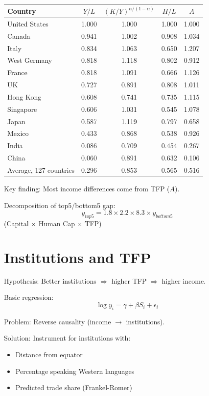 \documentclass[a4paper,11pt]{article}
\begin{document}
\begin{center}
\begin{tabular}{lcccc}
\toprule
Country & $Y/L$ & $(K/Y)^{\alpha/(1-\alpha)}$ & $H/L$ & $A$ \\
\midrule
United States & 1.000 & 1.000 & 1.000 & 1.000 \\
Canada & 0.941 & 1.002 & 0.908 & 1.034 \\
Italy & 0.834 & 1.063 & 0.650 & 1.207 \\
West Germany & 0.818 & 1.118 & 0.802 & 0.912 \\
France & 0.818 & 1.091 & 0.666 & 1.126 \\
UK & 0.727 & 0.891 & 0.808 & 1.011 \\
Hong Kong & 0.608 & 0.741 & 0.735 & 1.115 \\
Singapore & 0.606 & 1.031 & 0.545 & 1.078 \\
Japan & 0.587 & 1.119 & 0.797 & 0.658 \\
Mexico & 0.433 & 0.868 & 0.538 & 0.926 \\
India & 0.086 & 0.709 & 0.454 & 0.267 \\
China & 0.060 & 0.891 & 0.632 & 0.106 \\
\midrule
Average, 127 countries & 0.296 & 0.853 & 0.565 & 0.516 \\
\bottomrule
\end{tabular}
\end{center}

Key finding: Most income differences come from TFP ($A$).

Decomposition of top5/bottom5 gap:
\[
y_{top5} = 1.8 \times 2.2 \times 8.3 \times y_{bottom5}
\tag{Decomposition}
\]
(Capital $\times$ Human Cap $\times$ TFP)

\section{Institutions and TFP}

Hypothesis: Better institutions $\Rightarrow$ higher TFP $\Rightarrow$ higher income.

Basic regression:
\[
\log y_i = \gamma + \beta S_i + \epsilon_i
\tag{Institutions-Reg}
\]

Problem: Reverse causality (income $\to$ institutions).

Solution: Instrument for institutions with:
\begin{itemize}
    \item Distance from equator
    \item Percentage speaking Western languages
    \item Predicted trade share (Frankel-Romer)
\end{itemize}
\end{document}
